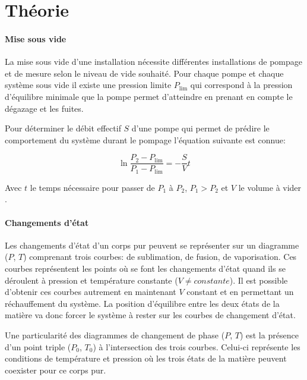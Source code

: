 \section{Théorie}

\paragraph*{Mise sous vide} La mise sous vide d'une installation nécessite différentes installations de pompage et de mesure selon le niveau de vide souhaité.
Pour chaque pompe et chaque système sous vide il existe une pression limite \(P_\textrm{lim}\) qui correspond à la pression d'équilibre minimale que la pompe permet d'atteindre en prenant en compte le dégazage et les fuites.

Pour déterminer le débit effectif \(S\) d'une pompe qui permet de prédire le comportement du système durant le pompage l'équation suivante est connue:

\begin{equation}
    \ln\frac{P_\textrm{2} - P_\textrm{lim}}{P_\textrm{1} - P_\textrm{lim}} = -\frac{S}{V}t
    \label{eq:cinetique}
\end{equation}

Avec \(t\) le temps nécessaire pour passer de \(P_\textrm{1}\) à \(P_\textrm{2}\), \(P_\textrm{1} > P_\textrm{2}\) et \(V\) le volume à vider \cite{notice}.

\paragraph*{Changements d'état} Les changements d'état d'un corps pur peuvent se représenter sur un diagramme (\(P\), \(T\)) comprenant trois courbes: de sublimation, de fusion, de vaporisation. Ces courbes représentent les points où se font les changements d'état quand ils se déroulent à pression et température constante (\(V \neq constante\)). Il est possible d'obtenir ces courbes autrement en maintenant \(V\) constant et en permettant un réchauffement du système. La position d'équilibre entre les deux états de la matière va donc forcer le système à rester sur les courbes de changement d'état.

Une particularité des diagrammes de changement de phase (\(P\), \(T\)) est la présence d'un point triple (\(P_\textrm{0}\), \(T_\textrm{0}\)) à l'intersection des trois courbes. Celui-ci représente les conditions de température et pression où les trois états de la matière peuvent coexister pour ce corps pur.

